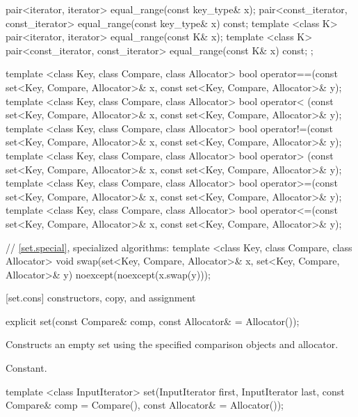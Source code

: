 \begin{codeblock}
{{    pair<iterator, iterator>               equal_range(const key_type& x);
    pair<const_iterator, const_iterator>   equal_range(const key_type& x) const;
    template <class K>
      pair<iterator, iterator>             equal_range(const K& x);
    template <class K>
      pair<const_iterator, const_iterator> equal_range(const K& x) const;
  };

  template <class Key, class Compare, class Allocator>
    bool operator==(const set<Key, Compare, Allocator>& x,
                    const set<Key, Compare, Allocator>& y);
  template <class Key, class Compare, class Allocator>
    bool operator< (const set<Key, Compare, Allocator>& x,
                    const set<Key, Compare, Allocator>& y);
  template <class Key, class Compare, class Allocator>
    bool operator!=(const set<Key, Compare, Allocator>& x,
                    const set<Key, Compare, Allocator>& y);
  template <class Key, class Compare, class Allocator>
    bool operator> (const set<Key, Compare, Allocator>& x,
                    const set<Key, Compare, Allocator>& y);
  template <class Key, class Compare, class Allocator>
    bool operator>=(const set<Key, Compare, Allocator>& x,
                    const set<Key, Compare, Allocator>& y);
  template <class Key, class Compare, class Allocator>
    bool operator<=(const set<Key, Compare, Allocator>& x,
                    const set<Key, Compare, Allocator>& y);

  // \ref{set.special}, specialized algorithms:
  template <class Key, class Compare, class Allocator>
    void swap(set<Key, Compare, Allocator>& x,
              set<Key, Compare, Allocator>& y)
      noexcept(noexcept(x.swap(y)));
}
\end{codeblock}%
%

[set.cons]{ constructors, copy, and assignment}

%
\begin{itemdecl}
explicit set(const Compare& comp, const Allocator& = Allocator());
\end{itemdecl}

\begin{itemdescr}
\pnum
\effects
Constructs an empty set using the specified comparison objects and allocator.

\pnum
\complexity
Constant.
\end{itemdescr}

%
\begin{itemdecl}
template <class InputIterator>
  set(InputIterator first, InputIterator last,
      const Compare& comp = Compare(), const Allocator& = Allocator());
\end{itemdecl}

